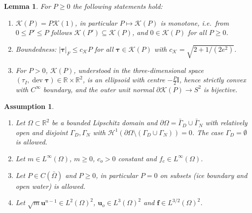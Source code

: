 \documentclass[10pt,a4paper]{amsart}
\newtheorem{lemma}{Lemma}
\newtheorem{assumption}{Assumption}
\newcommand{\K}{\mathcal{K}}
\newcommand{\bfI}{\boldsymbol{\mathrm{I}}}
\newcommand{\bff}{\boldsymbol{f}}
\newcommand{\bftau}{\boldsymbol{\tau}}
\newcommand{\bfu}{\boldsymbol{u}}
\DeclareMathOperator{\dev}{dev}
\begin{document}
\begin{lemma} \label{lema:prop_K}
    For $P\geq 0$ the following statements hold:
    \begin{enumerate}
        \item $\K(P) = P \K(1)$, in particular $P\mapsto \K(P)$ is monotone, i.e.\ from $0\leq P' \leq P$ follows $\K(P') \subseteq \K(P)$, and $0\in \K(P)$ for all $P\geq 0$.
        \item Boundedness: $|\bftau |_F \leq c_\K P$ for all $\bftau \in \K(P)$ with $c_\K = \sqrt{2+1/(2e^2)}$.
        \item For $P>0$, $\K(P)$, understood in the three-dimensional space $(\tau_I, \dev\bftau) \in \mathbb R \times \mathbb R^2$, is an ellipsoid with centre $-\frac{P}{2} \bfI$, hence strictly convex with $C^\infty$ boundary, and the outer unit normal $\partial \K(P) \rightarrow S^2$ is bijective.
    \end{enumerate}
\end{lemma}

\begin{assumption}\label{ass}
    \begin{enumerate}
        \item[(A1)] Let $\Omega \subset \mathbb R^2$ be a bounded Lipschitz domain and $\partial \Omega = \bar \Gamma_D \cup \bar \Gamma_N$ with relatively open and disjoint $\Gamma_D, \Gamma_N$ with $\mathcal{H}^1(\partial \Omega \setminus (\Gamma_D \cup \Gamma_N))=0$. The case $\Gamma_D = \emptyset$ is allowed.
        \item[(A2)] Let $m \in L^\infty(\Omega)$, $m\geq 0$, $c_o>0$ constant and $f_c \in L^\infty(\Omega)$.
        \item[(A3)] Let $P \in C(\bar \Omega)$ and $P\geq0$, in particular $P=0$
        on subsets (ice boundary and open water) is allowed.
        \item[(A4)] Let $\sqrt{m} \bfu^{n-1} \in L^2(\Omega)^2$, $\bfu_o \in L^3(\Omega)^2$ and $\bff \in L^{3/2}(\Omega)^2$.
    \end{enumerate}
\end{assumption}
\end{document}
